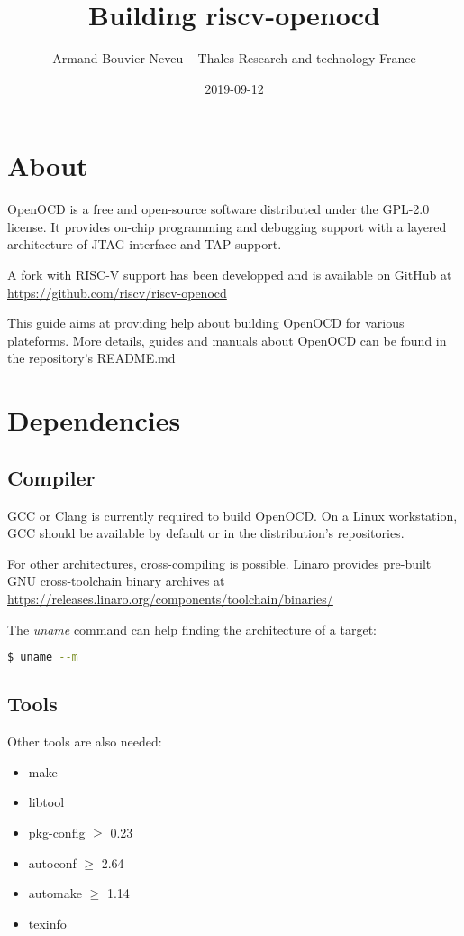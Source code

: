 \documentclass{article}
\title{Building riscv-openocd}
\date{2019-09-12}
\author{Armand Bouvier-Neveu -- Thales Research and technology France}
\begin{document}
	\maketitle
    
    \section{About}
    
    OpenOCD is a free and open-source software distributed under the GPL-2.0 license. It provides on-chip programming and debugging support with a layered architecture of JTAG interface and TAP support.
    
    A fork with RISC-V support has been developped and is available on GitHub at \url{https://github.com/riscv/riscv-openocd}
    
    This guide aims at providing help about building OpenOCD for various plateforms. More details, guides and manuals about OpenOCD can be found in the repository's README.md
    
    \section{Dependencies}
    
    \subsection{Compiler}
    
    GCC or Clang is currently required to build OpenOCD. On a Linux workstation, GCC should be available by default or in the distribution's repositories.
    
    For other architectures, cross-compiling is possible. Linaro provides pre-built GNU cross-toolchain binary archives at \url{https://releases.linaro.org/components/toolchain/binaries/}
    
    The \textit{uname} command can help finding the architecture of a target:
    
    \begin{lstlisting}[language=bash]
    $ uname --m
    \end{lstlisting}
    
    \subsection{Tools}
    
    Other tools are also needed:
    \begin{itemize}
    	\itemsep0em
    	\item make
    	\item libtool
    	\item pkg-config $\geqslant$ 0.23
    	\item autoconf $\geqslant$ 2.64
    	\item automake $\geqslant$ 1.14
    	\item texinfo
    \end{itemize}
    
\end{document}

